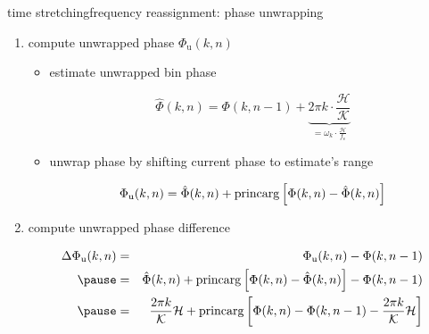         \begin{frame}{time stretching}{frequency reassignment: phase unwrapping}

            \begin{enumerate}
                \item	compute unwrapped phase $\Phi_{\mathrm{u}}(k,n)$ 
                        \begin{itemize}
                            \item	estimate unwrapped bin phase
                                    \begin{footnotesize}
                                    \begin{equation*}\label{eq:phi_est}
                                        \hat{\Phi}(k,n) = \Phi(k,n-1) + \underbrace{2\pi k\cdot\frac{\mathcal{H}}{\mathcal{K}}}_{=\omega_k\cdot\frac{\mathcal{H}}{f_\mathrm{s}}} 
                                    \end{equation*}
                                    \end{footnotesize}

                            \item<2->	unwrap phase by shifting current phase to estimate's range
                                    \begin{footnotesize}
                                    \begin{equation*}
                                        \Phi_{\mathrm{u}}(k,n) = \hat{\Phi}(k,n) + \operatorname*{princarg}\left[ \Phi(k,n) - \hat{\Phi}(k,n) \right]
                                    \end{equation*}
                                    \end{footnotesize}
                        \end{itemize}

                \item<3->	compute unwrapped phase difference
                        \begin{footnotesize}
                        \begin{eqnarray*}
                            \Delta\Phi_{\mathrm{u}}(k,n)	&=& \Phi_{\mathrm{u}}(k,n) - \Phi(k,n-1)\nonumber\\
                                                \pause
                                                &=& \hat{\Phi}(k,n) + \princarg\left[ \Phi(k,n) - \hat{\Phi}(k,n) \right] - \Phi(k,n-1)\nonumber \\
                                                \pause
                                                &=& \frac{2\pi k}{\mathcal{K}}\mathcal{H} + \princarg\left[ \Phi(k,n) - \Phi(k,n-1) - \frac{2\pi k}{\mathcal{K}}\mathcal{H} \right]\nonumber
                        \end{eqnarray*}
                        \end{footnotesize}
            \end{enumerate}
        
        \end{frame}

